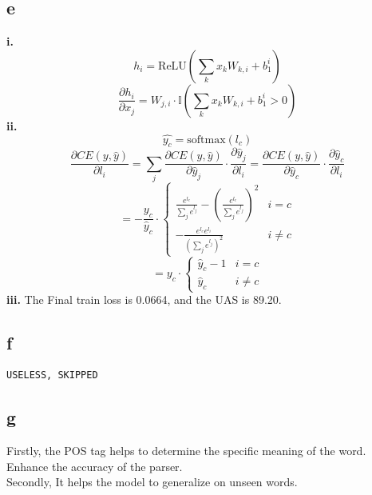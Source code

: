 \documentclass{article}
\begin{document}
\subsection*{e}
\textbf{i.}
\[
    h_i=\text{ReLU}\left(\sum_k x_k W_{k,i}+b_1^i\right)
\]
\[
    \frac{\partial h_i}{\partial x_j}=W_{j,i}\cdot\mathbb{I}\left(\sum_k x_k W_{k,i}+b_1^i>0\right)
\]
\textbf{ii.}
\[
    \hat{y_c}=\text{softmax}(l_c)
\]
\[
    \frac{\partial CE(y,\hat{y})}{\partial l_i}=\sum_j \frac{\partial CE(y,\hat{y})}{\partial \hat{y}_j}\cdot\frac{\partial \hat{y}_j}{\partial l_i}= \frac{\partial CE(y,\hat{y})}{\partial \hat{y}_c}\cdot\frac{\partial \hat{y}_c}{\partial l_i}
\]
\[
    =-\frac{y_c}{\hat{y}_c} \cdot \begin{cases}
        \frac{e^{l_c}}{\sum_j e^{l_j}}-\left(\frac{e^{l_c}}{\sum_j e^{l_j}}\right)^2 & i=c \\
        -\frac{e^{l_c}e^{l_i}}{\left(\sum_j e^{l_j}\right)^2} & i\neq c
    \end{cases}
\]
\[
    =y_c\cdot\begin{cases}
        \hat{y}_c-1 & i=c \\
        \hat{y}_c & i\neq c
    \end{cases}
\]
\textbf{iii.}
The Final train loss is 0.0664, and the UAS is 89.20.\\
\subsection*{f}
\texttt{USELESS, SKIPPED}
\subsection*{g}
Firstly, the POS tag helps to determine the specific meaning of the word. Enhance the accuracy of the parser.\\
Secondly, It helps the model to generalize on unseen words.\\
\end{document}
